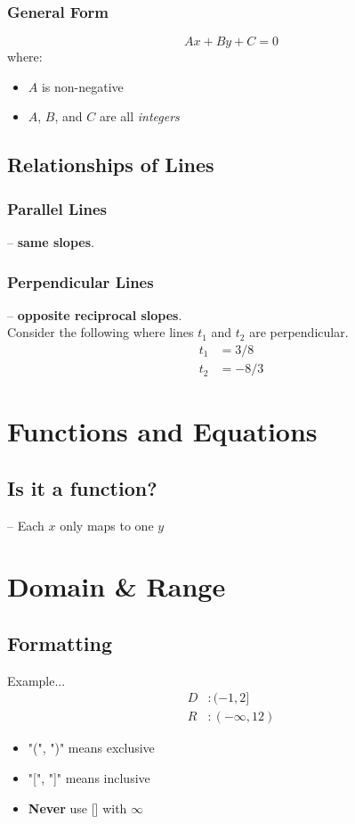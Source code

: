 \documentclass[twocolumn]{article}
\newcommand{\bd}{\textbf}
\begin{document}
	\subsubsection{General Form}
	\begin{equation*}
		Ax + By + C = 0
	\end{equation*}
	where:
	\begin{itemize}[label=--]
		\item[] $A$ is non-negative
		\item[] $A$, $B$, and $C$ are all \emph{integers}
	\end{itemize}
	\subsection{Relationships of Lines}
	\subsubsection{Parallel Lines}
	-- \bd{same slopes}.
	\subsubsection{Perpendicular Lines}
	-- \bd{opposite reciprocal slopes}. \\
	Consider the following where lines $t_1$ and $t_2$ are perpendicular.
	\begin{align*}
		t_1 &= 3/8 \\
		t_2 &= -8/3
	\end{align*}
	
	\section{Functions and Equations}
	
	\subsection{Is it a function?}
	-- Each $x$ only maps to one $y$
	
	\section{Domain \& Range}
	
	\subsection{Formatting}
	Example...
	\begin{align*}
		D&: (-1,2] \\
		R&: (-\infty, 12)
	\end{align*}
	\begin{itemize}[label=--]
		\item "(", ")" means exclusive
		\item "[", "]" means inclusive
		\item \bd{Never} use [] with $\infty$
	\end{itemize}
	
\end{document}
